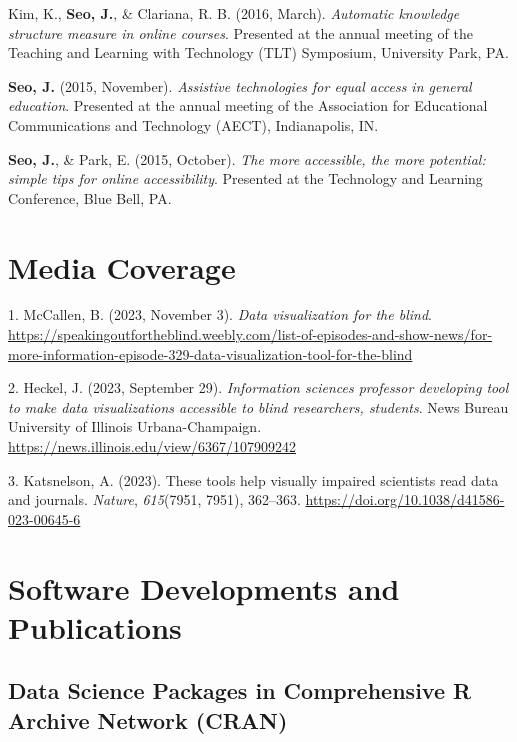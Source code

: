 \documentclass[11pt,a4paper,]{awesome-cv}
\newlength{\cslhangindent}
\newenvironment{CSLReferences}[2] %
 {\begin{list}{}{%
  \setlength{\itemindent}{0pt}
  \setlength{\leftmargin}{0pt}
  \setlength{\parsep}{0pt}
  \ifodd #1
   \setlength{\leftmargin}{\cslhangindent}
   \setlength{\itemindent}{-1\cslhangindent}
  \fi
  \setlength{\itemsep}{#2\baselineskip}}}
 {\end{list}}
\begin{document}
Kim, K., \textbf{Seo, J.}, \& Clariana, R. B. (2016, March).
\emph{Automatic knowledge structure measure in online courses}.
Presented at the annual meeting of the Teaching and Learning with
Technology (TLT) Symposium, University Park, PA.

\textbf{Seo, J.} (2015, November). \emph{Assistive technologies for
equal access in general education}. Presented at the annual meeting of
the Association for Educational Communications and Technology (AECT),
Indianapolis, IN.

\textbf{Seo, J.}, \& Park, E. (2015, October). \emph{The more
accessible, the more potential: simple tips for online accessibility}.
Presented at the Technology and Learning Conference, Blue Bell, PA.

\section{Media Coverage}\label{media-coverage-1}

\label{refs-37f5ad1f1850196509ec80c98fd22097}
\begin{CSLReferences}{1}{0}
1. McCallen, B. (2023, November 3). \emph{Data visualization for the
blind}.
\url{https://speakingoutfortheblind.weebly.com/list-of-episodes-and-show-news/for-more-information-episode-329-data-visualization-tool-for-the-blind}

2. Heckel, J. (2023, September 29). \emph{Information sciences professor
developing tool to make data visualizations accessible to blind
researchers, students}. News Bureau University of Illinois
Urbana-Champaign. \url{https://news.illinois.edu/view/6367/107909242}

3. Katsnelson, A. (2023). These tools help visually impaired scientists
read data and journals. \emph{Nature}, \emph{615}(7951, 7951), 362--363.
\url{https://doi.org/10.1038/d41586-023-00645-6}

\end{CSLReferences}

\section{Software Developments and
Publications}\label{software-developments-and-publications-1}

\subsection{Data Science Packages in Comprehensive R Archive Network
(CRAN)}\label{data-science-packages-in-comprehensive-r-archive-network-cran-1}
\end{document}
